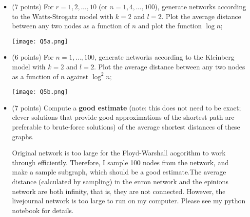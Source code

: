 \documentclass[11pt]{article} %
\begin{document}
\begin{itemize}
\item (7 points) For $r = 1, 2, \ldots, 10$ (or $n = 1, 4, \ldots, 100$), generate networks according to the Watts-Strogatz model with $k = 2$ and $l = 2$. Plot the average distance between any two nodes as a function of $n$ and plot the function $\log n$;

\begin{center}
\texttt{[image: Q5a.png]}
\end{center}

\item (6 points) For $n = 1, \ldots, 100$, generate networks according to the Kleinberg model with $k = 2$ and $l = 2$. Plot the average distance between any two nodes as a function of $n$ against $\log^2 n$;

\begin{center}
\texttt{[image: Q5b.png]}
\end{center}

\item (7 points) Compute a \textbf{good estimate} (note: this does not need to be exact; clever solutions that provide good approximations of the shortest path are preferable to brute-force solutions) of the average shortest distances of these graphs.

Original network is too large for the Floyd-Warshall aogorithm to work through efficiently. Therefore, I sample 100 nodes from the network, and make a sample subgraph, which should be a good estimate.The average distance (calculated by sampling) in the enron network and the epinions network are both infinity, that is, they are not connected. However, the livejournal network is too large to run on my computer. Please see my python notebook for details. 


\end{itemize}
\end{document}
